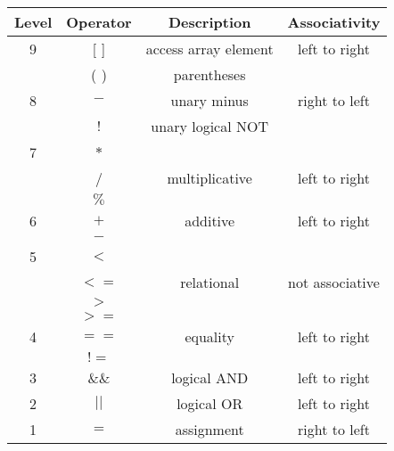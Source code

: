 \documentclass[12pt]{article}
\begin{document}
\begin{table}[htb]
\centering
\begin{tabular}{| c | c | c | c |} 
 \hline
Level & Operator & Description & Associativity        \\ \hline
 9    & [ ]      & access array element & left to right \\ 
      & ( )      & parentheses          &  \\ \hline\hline
          
 8    & $- $     & unary minus          & right to left \\ 
      & $!$      & unary logical NOT    & \\ \hline\hline
      
 7    & $*$      &                      & \\ 
      & /        & multiplicative       & left to right \\
      & $\%$     &                      & \\ \hline\hline
      
 6    & $+$      & additive             & left to right\\
      & $-$      &                      & \\  \hline\hline
 
 5    & $< $     &                      & \\
      & $<=$     & relational           & not associative\\
      & $> $     &                      & \\
      & $>=$     &                      &  \\  \hline\hline 
      
 4    & $==$     & equality             & left to right\\
      & $!=$     &                      & \\ \hline\hline
      
 3    & $\&\&$   & logical AND          & left to right\\   \hline\hline
 
 2    & $||$     & logical OR           & left to right\\   \hline\hline
 
 1    & $=$      & assignment           & right to left \\   \hline
 
\end{tabular}
\end{table}




\end{document}
